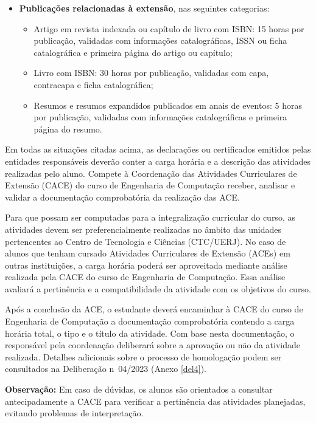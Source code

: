 \begin{itemize}
    \item \textbf{Publicações relacionadas à extensão}, nas seguintes categorias:
          \begin{itemize}
              \item Artigo em revista indexada ou capítulo de livro com ISBN: 15 horas por publicação, validadas com informações catalográficas, ISSN ou ficha catalográfica e primeira página do artigo ou capítulo;
              \item Livro com ISBN: 30 horas por publicação, validadas com capa, contracapa e ficha catalográfica;
              \item Resumos e resumos expandidos publicados em anais de eventos: 5 horas por publicação, validadas com informações catalográficas e primeira página do resumo.
          \end{itemize}

\end{itemize}

Em todas as situações citadas acima, as declarações ou certificados emitidos pelas entidades responsáveis deverão conter a carga horária e a descrição das atividades realizadas pelo aluno. Compete à Coordenação das Atividades Curriculares de Extensão (CACE) do curso de Engenharia de Computação receber, analisar e validar a documentação comprobatória da realização das ACE.

Para que possam ser computadas para a integralização curricular do curso, as atividades devem ser preferencialmente realizadas no âmbito das unidades pertencentes ao Centro de Tecnologia e Ciências (CTC/UERJ). No caso de alunos que tenham cursado Atividades Curriculares de Extensão (ACEs) em outras instituições, a carga horária poderá ser aproveitada mediante análise realizada pela CACE do curso de Engenharia de Computação. Essa análise avaliará a pertinência e a compatibilidade da atividade com os objetivos do curso.

Após a conclusão da ACE, o estudante deverá encaminhar à CACE do curso de Engenharia de Computação a documentação comprobatória contendo a carga horária total, o tipo e o título da atividade. Com base nesta documentação, o responsável pela coordenação deliberará sobre a aprovação ou não da atividade realizada. Detalhes adicionais sobre o processo de homologação podem ser consultados na Deliberação n\textordmasculine~04/2023 (Anexo \ref{del4}).

\textbf{Observação:} Em caso de dúvidas, os alunos são orientados a consultar antecipadamente a CACE para verificar a pertinência das atividades planejadas, evitando problemas de interpretação.


